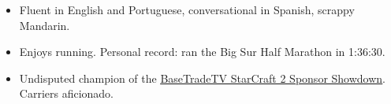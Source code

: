 

\begin{cvparagraph}


\begin{justify}
\begin{itemize}[leftmargin=2ex, nosep]
    \setlength{\parskip}{0pt}
    \setlength\itemsep{0.15em}
    \renewcommand{\labelitemi}{\bullet}
    
    \item Fluent in English and Portuguese, conversational in Spanish, scrappy Mandarin.
	\item Enjoys running. Personal record: ran the Big Sur Half Marathon in 1:36:30.
	\item Undisputed champion of the \href{http://www.teamliquid.net/forum/sc2-tournaments/529105-basetradetv-sponsor-showdown}{\underline {BaseTradeTV StarCraft 2 Sponsor Showdown}}. Carriers aficionado.


\end{itemize}
\end{justify}

\end{cvparagraph}
